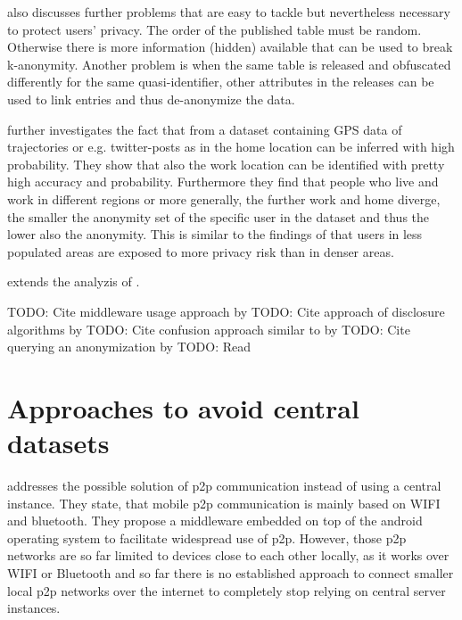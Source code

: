 \parencite{k-anonymity} also discusses further problems that are easy to tackle but nevertheless necessary to protect users' privacy. The order of the published table must be random. Otherwise there is more information (hidden) available that can be used to break k-anonymity. Another problem is when the same table is released and obfuscated differently for the same quasi-identifier, other attributes in the releases can be used to link entries and thus de-anonymize the data.

\parencite{privacy-home-work-pairs} further investigates the fact that from a dataset containing GPS data of trajectories or e.g. twitter-posts as in \parencite{twitter} the home location can be inferred with high probability. They show that also the work location can be identified with pretty high accuracy and probability. Furthermore they find that people who live and work in different regions or more generally, the further work and home diverge, the smaller the anonymity set of the specific user in the dataset and thus the lower also the anonymity. This is similar to the findings of \parencite{location-privacy} that users in less populated areas are exposed to more privacy risk than in denser areas.

\parencite{mix-zones} extends the analyzis of \parencite{location-privacy}.

TODO: Cite middleware usage approach by \parencite{gruteser2003anonymous}
TODO: Cite approach of disclosure algorithms by \parencite{gruteser2005anonymity}
TODO: Cite confusion approach similar to \parencite{time-to-confusion} by \parencite{hoh2005protecting}
TODO: Cite querying an anonymization by \parencite{mokbel2006new}
TODO: Read \parencite{tang2006putting}

\section{Approaches to avoid central datasets}

\parencite{p2p-android} addresses the possible solution of p2p communication instead of using a central instance. They state, that mobile p2p communication is mainly based on WIFI and bluetooth. They propose a middleware embedded on top of the android operating system to facilitate widespread use of p2p. However, those p2p networks are so far limited to devices close to each other locally, as it works over WIFI or Bluetooth and so far there is no established approach to connect smaller local p2p networks over the internet to completely stop relying on central server instances.

